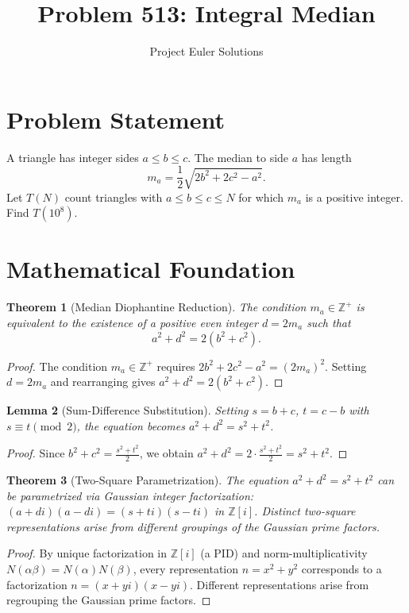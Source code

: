 \documentclass[11pt]{article}
\title{Problem 513: Integral Median}
\author{Project Euler Solutions}
\date{}
\newtheorem{theorem}{Theorem}
\newtheorem{lemma}[theorem]{Lemma}
\begin{document}
\maketitle

\section{Problem Statement}

A triangle has integer sides $a \leq b \leq c$. The median to side $a$ has length
\[
m_a = \frac{1}{2}\sqrt{2b^2 + 2c^2 - a^2}.
\]
Let $T(N)$ count triangles with $a \leq b \leq c \leq N$ for which $m_a$ is a positive integer. Find $T(10^8)$.

\section{Mathematical Foundation}

\begin{theorem}[Median Diophantine Reduction]
The condition $m_a \in \mathbb{Z}^+$ is equivalent to the existence of a positive even integer $d = 2m_a$ such that
\[
a^2 + d^2 = 2(b^2 + c^2).
\]
\end{theorem}

\begin{proof}
The condition $m_a \in \mathbb{Z}^+$ requires $2b^2 + 2c^2 - a^2 = (2m_a)^2$. Setting $d = 2m_a$ and rearranging gives $a^2 + d^2 = 2(b^2 + c^2)$.
\end{proof}

\begin{lemma}[Sum-Difference Substitution]
Setting $s = b + c$, $t = c - b$ with $s \equiv t \pmod{2}$, the equation becomes $a^2 + d^2 = s^2 + t^2$.
\end{lemma}

\begin{proof}
Since $b^2 + c^2 = \frac{s^2 + t^2}{2}$, we obtain $a^2 + d^2 = 2 \cdot \frac{s^2 + t^2}{2} = s^2 + t^2$.
\end{proof}

\begin{theorem}[Two-Square Parametrization]
The equation $a^2 + d^2 = s^2 + t^2$ can be parametrized via Gaussian integer factorization: $(a + di)(a - di) = (s + ti)(s - ti)$ in $\mathbb{Z}[i]$. Distinct two-square representations arise from different groupings of the Gaussian prime factors.
\end{theorem}

\begin{proof}
By unique factorization in $\mathbb{Z}[i]$ (a PID) and norm-multiplicativity $N(\alpha\beta) = N(\alpha)N(\beta)$, every representation $n = x^2 + y^2$ corresponds to a factorization $n = (x + yi)(x - yi)$. Different representations arise from regrouping the Gaussian prime factors.
\end{proof}
\end{document}

